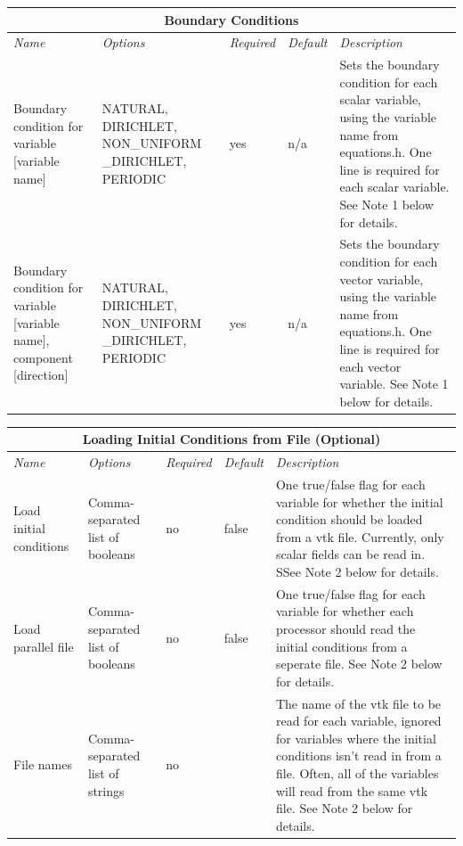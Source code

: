 \documentclass[10pt]{article} %
\begin{document}
\begin{center}
    \begin{tabular}{ | p{} | p{} | p{} | p{} | p{} |}
    \hline
      \multicolumn{5}{|c|}{\textbf{Boundary Conditions}} \\
    \hline
    \hline
    \emph{Name} & \emph{Options} & \emph{Required} & \emph{Default} & \emph{Description} \\ \hline
    Boundary condition for variable [variable name] & NATURAL, DIRICHLET, NON\_UNIFORM \_DIRICHLET, PERIODIC & yes & n/a & Sets the boundary condition for each scalar variable, using the variable name from equations.h. One line is required for each scalar  variable. See Note 1 below for details. \\ \hline
    Boundary condition for variable [variable name], component [direction] & NATURAL, DIRICHLET, NON\_UNIFORM \_DIRICHLET, PERIODIC & yes & n/a & Sets the boundary condition for each vector variable, using the variable name from equations.h. One line is required for each vector variable. See Note 1 below for details. \\ \hline
    \end{tabular}
\end{center}

\begin{center}
    \begin{tabular}{ | p{} | p{} | p{} | p{} | p{} |}
    \hline
      \multicolumn{5}{|c|}{\textbf{Loading Initial Conditions from File (Optional)}} \\
    \hline
    \hline
    \emph{Name} & \emph{Options} & \emph{Required} & \emph{Default} & \emph{Description} \\ \hline
    Load initial conditions & Comma-separated list of booleans & no & false & One true/false flag for each variable for whether the initial condition should be loaded from a vtk file. Currently, only scalar fields can be read in. SSee Note 2 below for details. \\ \hline
     Load parallel file & Comma-separated list of booleans & no & false & One true/false flag for each variable for whether each processor should read the initial conditions from a seperate file. See Note 2 below for details.  \\ \hline
      File names & Comma-separated list of strings & no &  & The name of the vtk file to be read for each variable, ignored for variables where the initial conditions isn't read in from a file. Often, all of the variables will read from the same vtk file. See Note 2 below for details.  \\ \hline
    \end{tabular}
\end{center}
\end{document}
